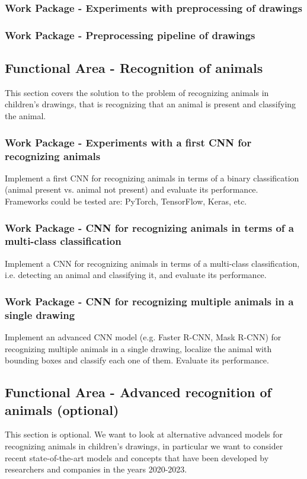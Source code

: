 \subsubsection{Work Package - Experiments with preprocessing of drawings}
\subsubsection{Work Package - Preprocessing pipeline of drawings}

\subsection{Functional Area - Recognition of animals}
This section covers the solution to the problem of recognizing animals in children's drawings, that is recognizing that an animal is present and classifying the animal.

\subsubsection{Work Package - Experiments with a first CNN for recognizing animals}
Implement a first CNN for recognizing animals in terms of a binary classification (animal present vs. animal not present) and evaluate its performance.
Frameworks could be tested are: PyTorch, TensorFlow, Keras, etc.
\subsubsection{Work Package - CNN for recognizing animals in terms of a multi-class classification}
Implement a CNN for recognizing animals in terms of a multi-class classification, i.e. detecting an animal and classifying it, and evaluate its performance.
\subsubsection{Work Package - CNN for recognizing multiple animals in a single drawing}
Implement an advanced CNN model (e.g. Faster R-CNN, Mask R-CNN) for recognizing multiple animals in a single drawing, localize the animal with bounding boxes and classify each one of them.
Evaluate its performance.
\subsection{Functional Area - Advanced recognition of animals (optional)}
This section is optional.
We want to look at alternative advanced models for recognizing animals in children's drawings, in particular we want to consider recent state-of-the-art models and concepts that have been developed by researchers and companies in the years 2020-2023.

